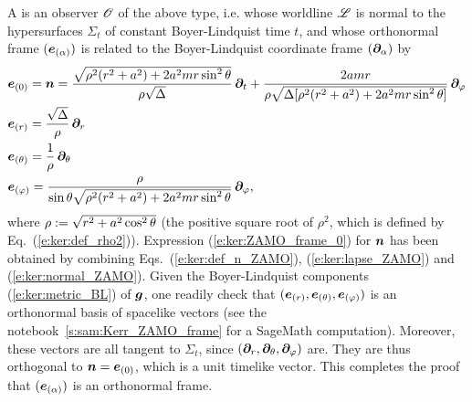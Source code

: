 A 
is an observer $\mathscr{O}$ of the above type, i.e. whose worldline $\mathscr{L}$ is normal to the
hypersurfaces $\Sigma_t$ of constant Boyer-Lindquist time $t$, and whose orthonormal frame
$(\bm{e}_{(\alpha)})$ is related to the Boyer-Lindquist coordinate frame $(\bm{\partial}_\alpha)$ by
\begin{subequations}
\label{e:ker:def_ZAMO_frame}
\begin{align}
  & \bm{e}_{(0)} = \bm{n} =
  \frac{\sqrt{\rho^2(r^2 + a^2) + 2 a^2 m r \sin^2\theta}}{\rho \sqrt{\Delta}} \,
  \bm{\partial}_t + \frac{2 a m r}{\rho \sqrt{\Delta[ \rho^2(r^2 + a^2) + 2 a^2 m r \sin^2\theta]}}\, \bm{\partial}_\varphi
    \label{e:ker:ZAMO_frame_0}\\
  & \bm{e}_{(r)} = \frac{\sqrt{\Delta}}{\rho} \, \bm{\partial}_r \\
  & \bm{e}_{(\theta)} = \frac{1}{\rho} \, \bm{\partial}_\theta \\
  & \bm{e}_{(\varphi)} =  \frac{\rho}{\sin\theta \sqrt{\rho^2(r^2 + a^2) + 2 a^2 m r \sin^2\theta}} \,
  \bm{\partial}_\varphi , \label{e:ker:ZAMO_frame_ph}
\end{align}
\end{subequations}
where $\rho := \sqrt{r^2 + a^2 \cos^2\theta}$ (the positive square root of $\rho^2$, which is
defined by Eq.~(\ref{e:ker:def_rho2})).
Expression (\ref{e:ker:ZAMO_frame_0}) for $\bm{n}$ has been obtained by
combining Eqs.~(\ref{e:ker:def_n_ZAMO}), (\ref{e:ker:lapse_ZAMO}) and (\ref{e:ker:normal_ZAMO}).
Given the Boyer-Lindquist components (\ref{e:ker:metric_BL}) of $\bm{g}$, one readily check
that $(\bm{e}_{(r)}, \bm{e}_{(\theta)},\bm{e}_{(\varphi)})$ is an orthonormal basis of spacelike vectors
(see the notebook~\ref{s:sam:Kerr_ZAMO_frame} for a SageMath computation).
Moreover, these vectors are all tangent to $\Sigma_t$, since $(\bm{\partial}_r, \bm{\partial}_\theta, \bm{\partial}_\varphi)$ are.
They are thus orthogonal to $\bm{n}=\bm{e}_{(0)}$, which is a unit timelike vector. This completes the proof that
$(\bm{e}_{(\alpha)})$ is an orthonormal frame.

